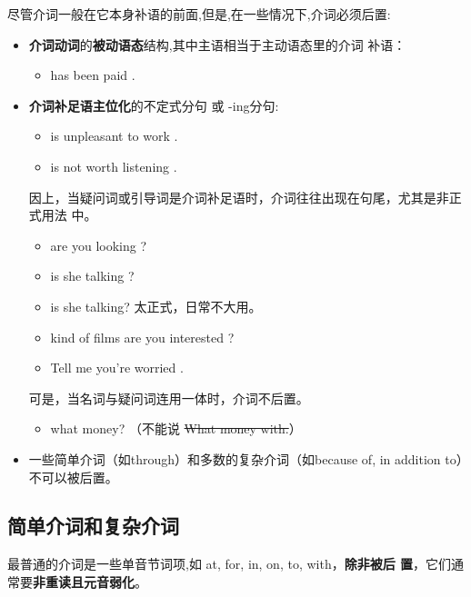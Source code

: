 尽管介词一般在它本身补语的前面,但是,在一些情况下,介词必须后置:
\begin{itemize}
\item \textbf{介词动词}的\textbf{被动语态}结构,其中主语相当于主动语态里的介词
  补语：
  \begin{itemize}
  \item {} has been paid .
  \end{itemize}

\item \textbf{介词补足语主位化}的不定式分句 或 -ing分句:
  \begin{itemize}
  \item {} is unpleasant to work .

  \item {} is not worth listening .
  \end{itemize}

  因上，当疑问词或引导词是介词补足语时，介词往往出现在句尾，尤其是非正式用法
  中。
  \begin{itemize}
  \item {} are you looking ?
  \item {} is she talking ?
  \item {} is she talking? 太正式，日常不大用。
  \item {} kind of films are you interested ?
  \item Tell me  you're worried .
  \end{itemize}

  可是，当名词与疑问词连用一体时，介词不后置。
  \begin{itemize}
  \item {} what money? （不能说 \sout{What money with.}）
  \end{itemize}

\item 一些简单介词（如through）和多数的复杂介词（如because of, in addition
  to）不可以被后置。

\end{itemize}

\subsection{简单介词和复杂介词}

最普通的介词是一些单音节词项,如 at, for, in, on, to, with，\textbf{除非被后
  置}，它们通常要\textbf{非重读且元音弱化}。

